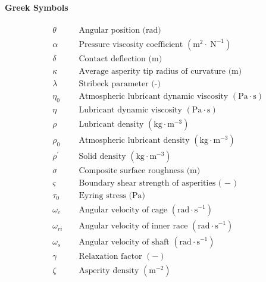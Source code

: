 \paragraph{Greek Symbols}
\begin{align*}
	&\theta && \text { Angular position (rad) } \\
	&\alpha && \text { Pressure viscosity coefficient }\left(\mathrm{m}^2 \cdot \mathrm{~N}^{-1}\right) \\
	&\delta && \text { Contact deflection (m) } \\
	&\kappa && \text { Average asperity tip radius of curvature (m) } \\
	&\lambda && \text { Stribeck parameter (-) } \\
	&\eta_0 && \text { Atmospheric lubricant dynamic viscosity }\left(\mathrm{Pa} \cdot \mathrm{s}\right) \\
	&\eta && \text { Lubricant dynamic viscosity }\left(\mathrm{Pa} \cdot \mathrm{s}\right) \\
	&\rho && \text { Lubricant density }\left(\mathrm{kg} \cdot \mathrm{m}^{-3} \right) \\
	&\rho_0 && \text { Atmospheric lubricant density }\left(\mathrm{kg} \cdot \mathrm{m}^{-3} \right) \\
	&\rho^{\prime} && \text { Solid density }\left(\mathrm{kg} \cdot \mathrm{m}^{-3} \right) \\
	&\sigma && \text { Composite surface roughness (m) } \\
	&\varsigma && \text { Boundary shear strength of asperities ( }- \text { ) } \\
	&\tau_0 && \text { Eyring stress (Pa) } \\
	&\omega_c && \text { Angular velocity of cage }\left(\mathrm{rad \cdot s}^{-1}\right) \\
	&\omega_{r i} && \text { Angular velocity of inner race }\left(\mathrm{rad \cdot s}^{-1}\right) \\
	&\omega_s && \text { Angular velocity of shaft }\left(\mathrm{rad \cdot s}^{-1}\right) \\
	&\gamma && \text { Relaxation factor }(-) \\
	&\zeta && \text { Asperity density }\left(\mathrm{m}^{-2}\right) \\
\end{align*}

